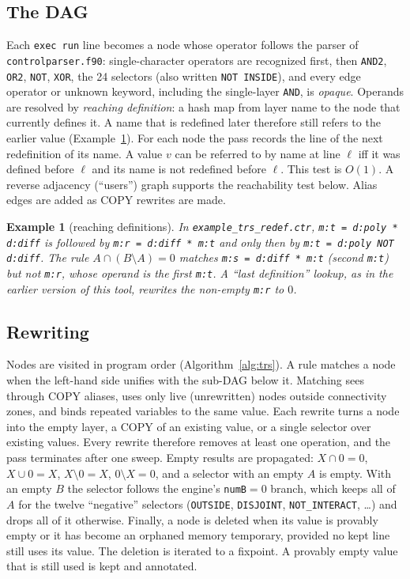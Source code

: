 \documentclass[11pt]{article}
\newtheorem{example}{Example}
\newcommand{\op}[1]{\texttt{#1}}
\begin{document}
\subsection{The DAG}
Each \texttt{exec run} line becomes a node whose operator follows the parser of \texttt{controlparser.f90}: single-character operators are recognized first, then \op{AND2}, \op{OR2}, \op{NOT}, \op{XOR}, the 24 selectors (also written \op{NOT INSIDE}), and every edge operator or unknown keyword, including the single-layer \op{AND}, is \emph{opaque}. Operands are resolved by \emph{reaching definition}: a hash map from layer name to the node that currently defines it. A name that is redefined later therefore still refers to the earlier value (Example~\ref{ex:redef}). For each node the pass records the line of the next redefinition of its name. A value $v$ can be referred to by name at line $\ell$ iff it was defined before $\ell$ and its name is not redefined before $\ell$. This test is $O(1)$. A reverse adjacency (``users'') graph supports the reachability test below. Alias edges are added as COPY rewrites are made.

\begin{example}[reaching definitions]\label{ex:redef}
In \texttt{example\_trs\_redef.ctr}, \texttt{m:t = d:poly * d:diff} is followed by \texttt{m:r = d:diff * m:t} and only then by \texttt{m:t = d:poly NOT d:diff}. The rule $A\cap(B\setminus A)=0$ matches \texttt{m:s = d:diff * m:t} (second \texttt{m:t}) but not \texttt{m:r}, whose operand is the first \texttt{m:t}. A ``last definition'' lookup, as in the earlier version of this tool, rewrites the non-empty \texttt{m:r} to $0$.
\end{example}

\subsection{Rewriting}
Nodes are visited in program order (Algorithm~\ref{alg:trs}). A rule matches a node when the left-hand side unifies with the sub-DAG below it. Matching sees through COPY aliases, uses only live (unrewritten) nodes outside connectivity zones, and binds repeated variables to the same value. Each rewrite turns a node into the empty layer, a COPY of an existing value, or a single selector over existing values. Every rewrite therefore removes at least one operation, and the pass terminates after one sweep. Empty results are propagated: $X\cap 0=0$, $X\cup0=X$, $X\setminus0=X$, $0\setminus X=0$, and a selector with an empty $A$ is empty. With an empty $B$ the selector follows the engine's \texttt{numB}$=0$ branch, which keeps all of $A$ for the twelve ``negative'' selectors (\op{OUTSIDE}, \op{DISJOINT}, \op{NOT\_INTERACT}, \dots) and drops all of it otherwise. Finally, a node is deleted when its value is provably empty or it has become an orphaned memory temporary, provided no kept line still uses its value. The deletion is iterated to a fixpoint. A provably empty value that is still used is kept and annotated.
\end{document}
